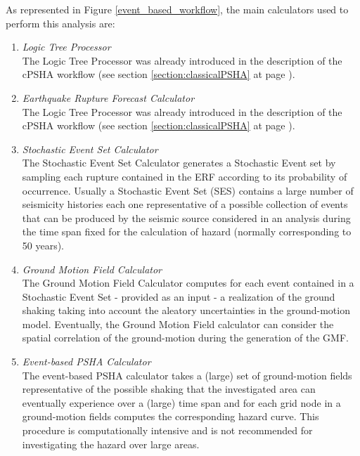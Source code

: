As represented in Figure \ref{event_based_workflow}, the main calculators 
used to perform this analysis are:
\begin{enumerate}
%
\item \emph{Logic Tree Processor} \hfill \\
The Logic Tree Processor was already 
introduced in the description of the cPSHA workflow (see section 
\ref{section:classicalPSHA} at page \pageref{section:classicalPSHA}).
%
\item \emph{Earthquake Rupture Forecast Calculator} \hfill \\ 
The Logic Tree Processor was already 
introduced in the description of the cPSHA workflow (see section 
\ref{section:classicalPSHA} at page \pageref{section:classicalPSHA}).
%
\item \emph{Stochastic Event Set Calculator} \hfill \\
The Stochastic Event Set Calculator generates a Stochastic Event set 
by sampling each rupture contained in the ERF according to its 
probability of occurrence. Usually a Stochastic Event Set (SES) contains
a large number of seismicity histories each one representative of a  
possible collection of events that can be produced by the seismic source
considered in an analysis during the time span fixed for the calculation
of hazard (normally corresponding to 50 years).
%
\item \emph{Ground Motion Field Calculator} \hfill \\
The Ground Motion Field Calculator computes for each event contained in a 
Stochastic Event Set - provided as an input - a realization of the 
ground shaking taking into account the aleatory uncertainties in 
the ground-motion model. Eventually, the Ground Motion Field calculator 
can consider the spatial correlation of the ground-motion during the 
generation of the GMF.
%
\item \emph{Event-based PSHA Calculator} \hfill \\
The event-based PSHA calculator takes a (large) set of ground-motion 
fields representative of the possible shaking that the investigated 
area can eventually experience over a (large) time span and for each 
grid node in a ground-motion fields computes the corresponding hazard 
curve. 
%
This procedure is computationally intensive and is not recommended for 
investigating the hazard over large areas. 
\end{enumerate}

